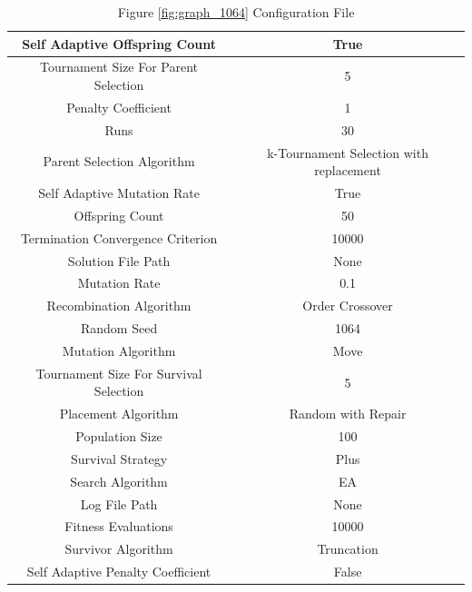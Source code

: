 \documentclass{standalone}
\begin{document}
\begin{table}[!htb]
	\centering
	\caption{Figure \ref{fig:graph_1064} Configuration File}
	\label{tab:graph_1064}
	\begin{tabular}{| c | c |}
		\hline
		Self Adaptive Offspring Count		& True		 \\
		\hline
		Tournament Size For Parent Selection		& 5		 \\
		\hline
		Penalty Coefficient		& 1		 \\
		\hline
		Runs		& 30		 \\
		\hline
		Parent Selection Algorithm		& k-Tournament Selection with replacement		 \\
		\hline
		Self Adaptive Mutation Rate		& True		 \\
		\hline
		Offspring Count		& 50		 \\
		\hline
		Termination Convergence Criterion		& 10000		 \\
		\hline
		Solution File Path		& None		 \\
		\hline
		Mutation Rate		& 0.1		 \\
		\hline
		Recombination Algorithm		& Order Crossover		 \\
		\hline
		Random Seed		& 1064		 \\
		\hline
		Mutation Algorithm		& Move		 \\
		\hline
		Tournament Size For Survival Selection		& 5		 \\
		\hline
		Placement Algorithm		& Random with Repair		 \\
		\hline
		Population Size		& 100		 \\
		\hline
		Survival Strategy		& Plus		 \\
		\hline
		Search Algorithm		& EA		 \\
		\hline
		Log File Path		& None		 \\
		\hline
		Fitness Evaluations		& 10000		 \\
		\hline
		Survivor Algorithm		& Truncation		 \\
		\hline
		Self Adaptive Penalty Coefficient		& False		 \\
		\hline
	\end{tabular}
\end{table}
\end{document}
